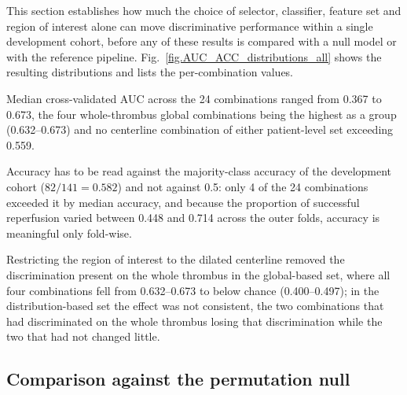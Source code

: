 \documentclass[preprint,12pt]{elsarticle}
\begin{document}
This section establishes how much the choice of selector, classifier, feature set and region of interest alone can move discriminative performance within a single development cohort, before any of these results is compared with a null model or with the reference pipeline. Fig.~\ref{fig.AUC_ACC_distributions_all} shows the resulting distributions and  lists the per-combination values.


Median cross-validated AUC across the 24 combinations ranged from 0.367 to 0.673, the four whole-thrombus global combinations being the highest as a group (0.632--0.673) and no centerline combination of either patient-level set exceeding 0.559.

Accuracy has to be read against the majority-class accuracy of the development cohort ($82/141 = 0.582$) and not against 0.5: only 4 of the 24 combinations exceeded it by median accuracy, and because the proportion of successful reperfusion varied between 0.448 and 0.714 across the outer folds, accuracy is meaningful only fold-wise.


Restricting the region of interest to the dilated centerline removed the discrimination present on the whole thrombus in the global-based set, where all four combinations fell from 0.632--0.673 to below chance (0.400--0.497); in the distribution-based set the effect was not consistent, the two combinations that had discriminated on the whole thrombus losing that discrimination while the two that had not changed little.











\subsection{Comparison against the permutation null}
\end{document}
